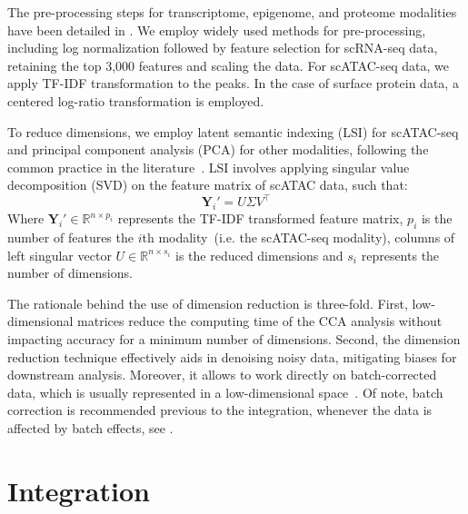 The pre-processing steps for transcriptome, epigenome, and proteome modalities have been detailed in . We employ widely used methods for pre-processing, including log normalization followed by feature selection for scRNA-seq data, retaining the top 3,000 features and scaling the data. For scATAC-seq data, we apply TF-IDF transformation to the peaks. In the case of surface protein data, a centered log-ratio transformation is employed.


To reduce dimensions, we employ latent semantic indexing (LSI) for scATAC-seq and principal component analysis (PCA) for other modalities, following the common practice in the literature~\cite{granja2021archr, signac, hao2021seurat4}. LSI involves applying singular value decomposition (SVD) on the feature matrix of scATAC data, such that:
\begin{equation}
    \textbf{Y}_{i}' = U\Sigma V^\top
\end{equation}
Where $\textbf{Y}_{i}'\in \mathbb{R}^{n\times p_{i}}$ represents the TF-IDF transformed feature matrix, $p_{i}$ is the number of features the $i$th modality~(i.e. the scATAC-seq modality), columns of left singular vector $U\in \mathbb{R}^{n\times s_i}$ is the reduced dimensions and $s_i$ represents the number of dimensions.

The rationale behind the use of dimension reduction is three-fold. First, low-dimensional matrices reduce the computing time of the CCA analysis without impacting accuracy for a minimum number of dimensions. Second, the dimension reduction technique effectively aids in denoising noisy data, mitigating biases for downstream analysis. Moreover, it allows to work directly on batch-corrected data, which is usually represented in a low-dimensional space~\citep{hao2021seurat4, korsunsky2019harmony}. Of note, batch correction is recommended previous to the integration, whenever the data is affected by batch effects, see .

\section{Integration}
\label{inte_methods:integration}
